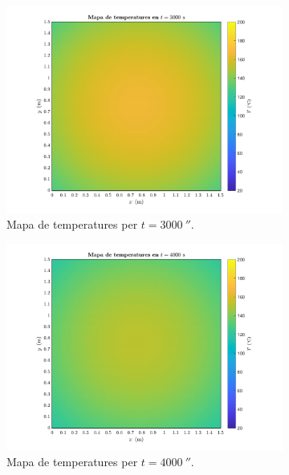 \begin{figure}[ht]
\begin{subfigure}{.5\textwidth}
		\centering
		\includegraphics[width=.95\linewidth]{imagenes/06_canvi_condicions_contorn/t_3000.pdf}
		\vspace{-10pt}
		\caption{Mapa de temperatures per $t = 3000 \ \second$.}
		\label{fig:nou_t_3000}
	\end{subfigure}%
	\begin{subfigure}{.5\textwidth}
		\centering
		\includegraphics[width=.95\linewidth]{imagenes/06_canvi_condicions_contorn/t_4000.pdf}
		\vspace{-10pt}
		\caption{Mapa de temperatures per $t = 4000 \ \second$.}
		\label{fig:nou_t_4000}
	\end{subfigure}
	\begin{subfigure}{.5\textwidth}
		\centering

\end{subfigure}
\end{figure}
